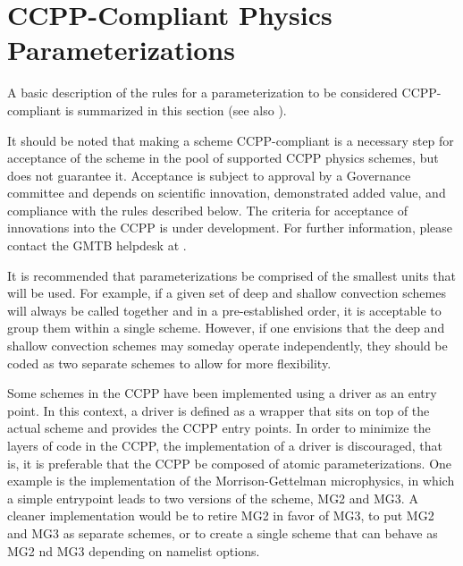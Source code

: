 \documentclass[letterpaper,10pt,english]{sphinxmanual}
\begin{document}
\chapter{CCPP-Compliant Physics Parameterizations}
\label{\detokenize{CompliantPhysicsParams:ccpp-compliant-physics-parameterizations}}\label{\detokenize{CompliantPhysicsParams:compliantphysparams}}\label{\detokenize{CompliantPhysicsParams::doc}}
A basic description of the rules for a parameterization to be considered CCPP-compliant
is summarized in this section (see also ).

It should be noted that making a scheme CCPP-compliant is a necessary step for acceptance of the
scheme in the pool of supported CCPP physics schemes, but does not guarantee it. Acceptance is subject to
approval by a Governance committee and depends on scientific innovation, demonstrated added
value, and compliance with the rules described below. The criteria for acceptance of innovations into the
CCPP is under development. For further information, please contact the GMTB helpdesk at .

It is recommended that parameterizations be comprised of the smallest units that will be used.
For example, if a given set of deep and shallow convection schemes will always be called together
and in a pre-established order, it is acceptable to group them within a single scheme. However, if one
envisions that the deep and shallow convection schemes may someday operate independently, they should
be coded as two separate schemes to allow for more flexibility.

Some schemes in the CCPP have been implemented using a driver as an entry point. In this context,
a driver is defined as a wrapper that sits on top of the actual scheme and provides the CCPP entry
points. In order to minimize the layers of code in the CCPP, the implementation of a driver is
discouraged, that is, it is preferable that the CCPP be composed of atomic parameterizations. One
example is the implementation of the Morrison-Gettelman microphysics, in which a simple entrypoint
leads to two versions of the scheme, MG2 and MG3.  A cleaner implementation would be to retire MG2
in favor of MG3, to put MG2 and MG3 as separate schemes, or to create a single scheme that can behave
as MG2 nd MG3 depending on namelist options.
\end{document}
